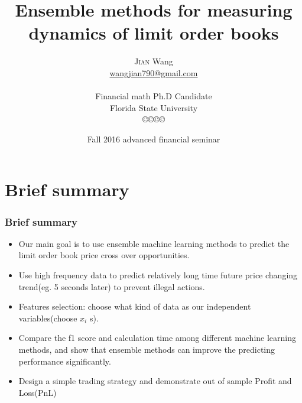 \documentclass[xcolor={x11names,svgnames,dvipsnames}]{beamer}
\author[\textsc{Jian} Wang]{\textsc{Jian} Wang\\[1ex]%
{\small\url{wangjian790@gmail.com}\\[-.5ex]\url{}}\\
{\small{Financial math Ph.D Candidate}}\\
{\small{Florida State University}}\\
[0.8ex]\copyright\copyright\copyright\copyright} %
\title{Ensemble methods for measuring dynamics of limit order books}
\date[\textsc{Financial seminar} 2016]{Fall 2016 advanced financial seminar\\ }%
\begin{document}
\begin{frame}
\maketitle
\end{frame}



\section{Brief summary}
\begin{frame}
\frametitle{Brief summary}
\begin{itemize}
	\item Our main goal is to use ensemble machine learning methods to predict the limit order book price \alert{cross over} opportunities.  	
	\item Use high frequency data to predict relatively \alert{long time} future price changing trend(eg. 5 seconds later) to prevent illegal actions.
     \item Features selection: choose what kind of data as our independent variables(\alert{choose $x_i$ s}).  
   	\item Compare the f1 score and calculation time  among different machine learning methods, and show that ensemble methods can improve the \alert{predicting performance} significantly.  	
   	\item Design a simple trading strategy and demonstrate \alert{out of sample} Profit and Loss(PnL)
\end{itemize}
\end{frame}
\end{document}
